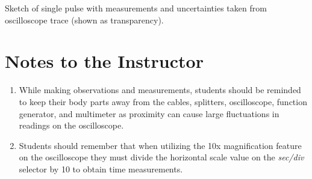 \begin{marginfigure}
\caption{Sketch of single pulse with measurements and uncertainties taken from oscilloscope trace (shown as transparency).}
\label{fig:twcg2}
\end{marginfigure}

\section{Notes to the Instructor}
\begin{enumerate}
\item While making observations and measurements, students should be reminded to keep their body parts away from the cables, splitters, oscilloscope, function generator, and multimeter as proximity can cause large fluctuations in readings on the oscilloscope.
\item Students should remember that when utilizing the 10x magnification feature on the oscilloscope they must divide the horizontal scale value on the {\it sec/div} selector by 10 to obtain time measurements. 
\end{enumerate}


